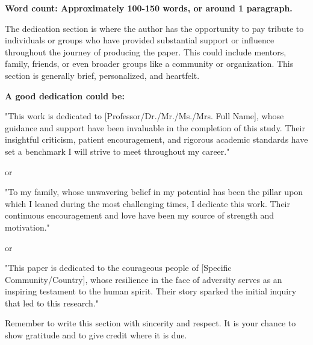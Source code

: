 \thispagestyle{empty} %

\textbf{Word count: Approximately 100-150 words, or around 1 paragraph.}

The dedication section is where the author has the opportunity to pay tribute to individuals or groups who have provided substantial support or influence throughout the journey of producing the paper. This could include mentors, family, friends, or even broader groups like a community or organization. This section is generally brief, personalized, and heartfelt.

\textbf{A good dedication could be:}

"This work is dedicated to [Professor/Dr./Mr./Ms./Mrs. Full Name], whose guidance and support have been invaluable in the completion of this study. Their insightful criticism, patient encouragement, and rigorous academic standards have set a benchmark I will strive to meet throughout my career."

or

"To my family, whose unwavering belief in my potential has been the pillar upon which I leaned during the most challenging times, I dedicate this work. Their continuous encouragement and love have been my source of strength and motivation."

or

"This paper is dedicated to the courageous people of [Specific Community/Country], whose resilience in the face of adversity serves as an inspiring testament to the human spirit. Their story sparked the initial inquiry that led to this research."

Remember to write this section with sincerity and respect. It is your chance to show gratitude and to give credit where it is due.
